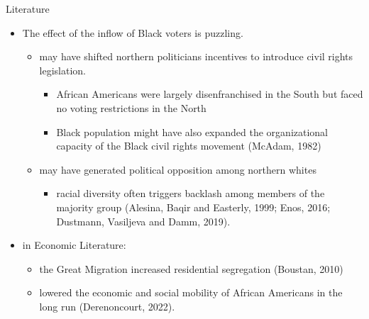 \documentclass[dvipdfmx,11pt]{beamer}
\begin{document}
\begin{frame}{Literature}
  \begin{itemize}
    \item The effect of the inflow of Black voters is puzzling.
    \begin{itemize}
      \item may have shifted northern politicians incentives to introduce civil rights legislation.
      \begin{itemize}
        \item African Americans were largely disenfranchised in the South but faced no voting restrictions in the North
        \item Black population might have also expanded the organizational capacity of the Black civil rights movement (McAdam, 1982)
      \end{itemize}
      \item may have generated political opposition among northern whites
      \begin{itemize}
        \item racial diversity often triggers backlash among members of the majority group (Alesina, Baqir and Easterly, 1999; Enos, 2016; Dustmann, Vasiljeva and Damm, 2019).
      \end{itemize}
    \end{itemize}
    \item in Economic Literature: 
    \begin{itemize}
      \item the Great Migration increased residential segregation (Boustan, 2010)
      \item lowered the economic and social mobility of African Americans in the long run (Derenoncourt, 2022).
    \end{itemize}
  \end{itemize}
\end{frame}
\end{document}
